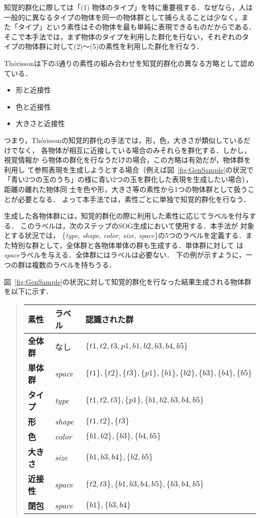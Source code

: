 \documentclass[japanese]{jnlp_1.2}
\begin{document}
知覚的群化に際しては「(1) 物体のタイプ」を特に重要視する．なぜなら，人は
一般的に異なるタイプの物体を同一の物体群として捕らえることは少なく，ま
た「タイプ」という素性はその物体を最も単純に表現できるものだからである．
そこで本手法では，まず物体のタイプを利用した群化を行ない，それぞれのタ
イプの物体群に対して(2)〜(5)の素性を利用した群化を行なう．

Th\'{o}rissonは下の3通りの素性の組み合わせを知覚的群化の異なる方略として認めている．
\begin{itemize}
\item 形と近接性
\item 色と近接性
\item 大きさと近接性
\end{itemize}
つまり，Th\'{o}rissonの知覚的群化の手法では，形，色，大きさが類似しているだけでなく，
各物体が相互に近接している場合のみそれらを群化する．しかし，視覚情報か
ら物体の群化を行なうだけの場合，この方略は有効だが，物体群を利用し
て参照表現を生成しようとする場合（例えば図~\ref{fig:GenSample}の状況で
「青い2つの玉のうち」の様に青い2つの玉を群化した表現を生成したい場合），距離の離れた物体同
士を色や形，大きさ等の素性から1つの物体群として扱うことが必要となる．
よって本手法では，素性ごとに単独で知覚的群化を行なう．

生成した各物体群には，知覚的群化の際に利用した素性に応じてラベルを付与する．
このラベルは，次のステップのSOG生成において使用する．本手法が
対象とする状況では，
\{\textit{type, shape, color, size, space}\}の5つのラベルを定義する．ま
た特別な群として，全体群と各物体単体の群も生成する．単体群に対して
は\textit{space}ラベルを与える．全体群にはラベルは必要ない．
下の例が示すように，一つの群は複数のラベルを持ちうる．

図~\ref{fig:GenSample}の状況に対して知覚的群化を行なった結果生成される物体群を以下に示す．
\bigskip

\begin{quote}
  \renewcommand{\arraystretch}{}
  \begin{tabular}{lll}
    \hline
    素性 & ラベル & 認識された群\\ 
    \hline
    {\bf 全体群} & なし & $\{t1,t2,t3,p1,b1,b2,b3,b4,b5\}$\\
    {\bf 単体群} &\textit{space}& $\{t1\},\{t2\},\{t3\},\{p1\},\{b1\},\{b2\},\{b3\},\{b4\},\{b5\}$\\
    {\bf タイプ} &\textit{type}& $\{t1,t2,t3\},\{p1\},\{b1,b2,b3,b4,b5\}$\\
    {\bf 形} &\textit{shape}& $\{t1,t2\},\{t3\}$\\
    {\bf 色} &\textit{color}& $\{b1,b2\},\{b3\},\{b4,b5\}$\\
    {\bf 大きさ} &\textit{size}& $\{b1,b3,b4\},\{b2,b5\}$\\
    {\bf 近接性} &\textit{space}& $\{t2,t3\},\{b1,b3,b4,b5\},\{b3,b4,b5\}$\\
    {\bf 閉包} &\textit{space}& $\{b1\},\{b3,b4\}$\\
    \hline
  \end{tabular}
\end{quote}
\end{document}
